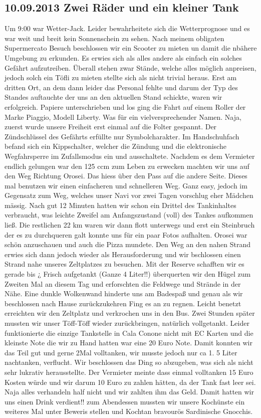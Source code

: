 \subsection{10.09.2013 Zwei Räder und ein kleiner Tank} 
Um 9:00 war Wetter-Jack.
Leider bewahrheitete sich die Wetterprognose und es war weit und breit kein Sonnenschein zu sehen.
Nach meinem obligaten Supermercato Besuch beschlossen wir ein Scooter zu mieten un damit die nbähere Umgebung zu erkunden.
Es erwies sich als alles andere als einfach ein solches Gefährt aufzutreiben.
Überall stehen zwar Stände, welche alles möglich anpreisen, jedoch solch ein Töfli zu mieten stellte sich als nicht trivial heraus.
Erst am dritten Ort, an dem dann leider das Personal fehlte und darum der Typ des Standes auftauchte der uns an den aktuellen Stand schickte, waren wir erfolgreich.
Papiere unterschrieben und los ging die Fahrt auf einem Roller der Marke Piaggio, Modell Liberty.
Was für ein vielversprechender Namen.
Naja, zuerst wurde unsere Freiheit erst einmal auf die Folter gespannt.
Der Zündschlüssel des Gefährts erfüllte nur Symbolcharakter.
Im Handschuhfach befand sich ein Kippschalter, welcher die Zündung und die elektronische Wegfahrsperre im Zufallsmodus ein und ausschaltete.
Nachdem es dem Vermieter endlich gelungen war den 125 ccm zum Leben zu erwecken machten wir uns auf den Weg Richtung Orosei.
Das hiess über den Pass auf die andere Seite.
Dieses mal benutzen wir einen einfacheren und schnelleren Weg.
Ganz easy, jedoch im Gegensatz zum Weg, welches unser Navi vor zwei Tagen vorschlug eher Mädchen mässig.
Nach gut 12 Minuten hatten wir schon ein Drittel des Tankinhaltes verbraucht, was leichte Zweifel am Anfangszustand (voll) des Tankes aufkommen ließ.
Die restlichen 22 km waren wir dann flott unterwegs und erst ein Steinbruch der es zu durchqueren galt konnte uns für ein paar Fotos aufhalten.
Orosei war schön anzuschauen und auch die Pizza mundete.
Den Weg an den nahen Strand erwies sich dann jedoch wieder als Herausforderung und wir bschlossen einen Strand nahe unseres Zeltplatzes zu besuchen.
Mit der Reserve schafften wir es gerade bis ¿ Frisch aufgetankt (Ganze 4 Liter!!) überquerten wir den Hügel zum Zweiten Mal an diesem Tag und erforschten die Feldwege und Strände in der Nähe.
Eine dunkle Wolkenwand hinderte uns am Badespaß und genau als wir beschlossen nach Hause zurückzukehren Fing es an zu regnen.
Leicht benetzt erreichten wir den Zeltplatz und verkrochen uns in den Bus.
Zwei Stunden später mussten wir unser Töff-Töff wieder zurückbringen, natürlich vollgetankt.
Leider funktionierte die einzige Tankstelle in Cala Conone nicht mit EC Karten und die kleinste Note die wir zu Hand hatten war eine 20 Euro Note.
Damit konnten wir das Teil gut und gerne 2Mal volltanken, wir musste jedoch nur ca 1.
5 Liter nachtanken, verflucht.
Wir beschlossen das Ding so abzugeben, was sich als nicht sehr lukrativ herausstellte.
Der Vermieter meinte dass einmal volltanken 15 Euro Kosten würde und wir darum 10 Euro zu zahlen hätten, da der Tank fast leer sei.
Naja alles verhandeln half nicht und wir zahlten ihm das Geld.
Damit hatten wir uns einen Drink verdient!! zum Abendessen mussten wir unsere Kochünste ein weiteres Mal unter Beweris stellen und Kochtan bravourös Sardinische Gnocchis. 

